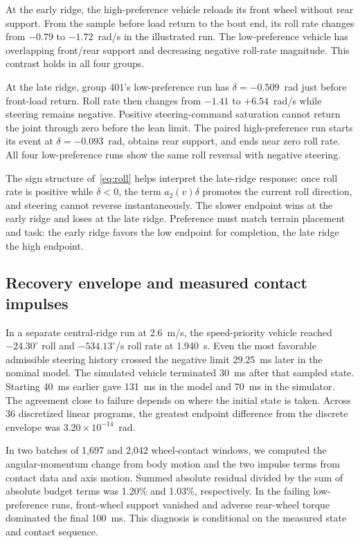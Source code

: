 \documentclass[journal]{IEEEtran}
\begin{document}
At the early ridge, the high-preference vehicle reloads its front wheel without rear support. From the sample before load return to the bout end, its roll rate changes from $-0.79$ to $-1.72$~rad/s in the illustrated run. The low-preference vehicle has overlapping front/rear support and decreasing negative roll-rate magnitude. This contrast holds in all four groups.

At the late ridge, group 401's low-preference run has $\delta=-0.509$~rad just before front-load return. Roll rate then changes from $-1.41$ to $+6.54$~rad/s while steering remains negative. Positive steering-command saturation cannot return the joint through zero before the lean limit. The paired high-preference run starts its event at $\delta=-0.093$~rad, obtains rear support, and ends near zero roll rate. All four low-preference runs show the same roll reversal with negative steering.

The sign structure of~\eqref{eq:roll} helps interpret the late-ridge response: once roll rate is positive while $\delta<0$, the term $a_2(v)\delta$ promotes the current roll direction, and steering cannot reverse instantaneously. The slower endpoint wins at the early ridge and loses at the late ridge. Preference must match terrain placement and task: the early ridge favors the low endpoint for completion, the late ridge the high endpoint.

\subsection{Recovery envelope and measured contact impulses}
In a separate central-ridge run at 2.6~m/s, the speed-priority vehicle reached $-24.30^\circ$ roll and $-534.13^\circ$/s roll rate at 1.940~s. Even the most favorable admissible steering history crossed the negative limit 29.25~ms later in the nominal model. The simulated vehicle terminated 30~ms after that sampled state. Starting 40~ms earlier gave 131~ms in the model and 70~ms in the simulator. The agreement close to failure depends on where the initial state is taken. Across 36 discretized linear programs, the greatest endpoint difference from the discrete envelope was $3.20\times10^{-14}$~rad.

In two batches of 1,697 and 2,042 wheel-contact windows, we computed the angular-momentum change from body motion and the two impulse terms from contact data and axis motion. Summed absolute residual divided by the sum of absolute budget terms was 1.20\% and 1.03\%, respectively. In the failing low-preference runs, front-wheel support vanished and adverse rear-wheel torque dominated the final 100~ms. This diagnosis is conditional on the measured state and contact sequence.
\end{document}
